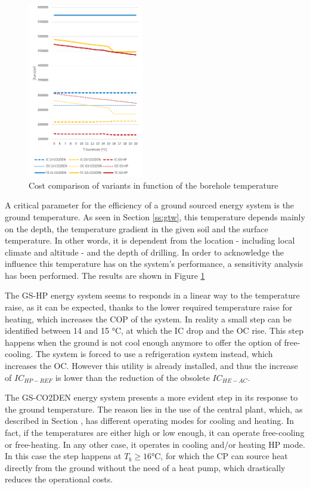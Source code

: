 \documentclass{article}
\begin{document}
\begin{figure} 
	\vspace{-20pt}
	\centering
	\includegraphics[width=0.45\textwidth]{V_SA_Tg.png}
	\caption{Cost comparison of variants in function of the borehole temperature}
	\label{fig:V_SA_Tg}
	\vspace{-10pt}
\end{figure}

A critical parameter for the efficiency of a ground sourced energy system is the ground temperature. As seen in Section \ref{ss:gtw}, this temperature depends mainly on the depth, the temperature gradient in the given soil and the surface temperature. In other words, it is dependent from the location - including local climate and altitude - and the depth of drilling. In order to acknowledge the influence this temperature has on the system's performance, a sensitivity analysis has been performed. The results are shown in Figure \ref{fig:V_SA_Tg}

The GS-HP energy system seems to responds in a linear way to the temperature raise, as it can be expected, thanks to the lower required temperature raise for heating, which increases the COP of the system. In reality a small step can be identified between 14 and 15 \si{\celsius}, at which the IC drop and the OC rise. This step happens when the ground is not cool enough anymore to offer the option of free-cooling. The system is forced to use a refrigeration system instead, which increases the OC. However this utility is already installed, and thus the increase of $IC_{HP-REF}$ is lower than the reduction of the obsolete $IC_{HE-AC}$.

The GS-CO2DEN energy system presents a more evident step in its response to the ground temperature. The reason lies in the use of the central plant, which, as described in Section , has different operating modes for cooling and heating. In fact, if the temperatures are either high or low enough, it can operate free-cooling or free-heating. In any other case, it operates in cooling and/or heating HP mode. In this case the step happens at $T_{b} \geq 16 \si{\celsius}$, for which the CP can source heat directly from the ground without the need of a heat pump, which drastically reduces the operational costs.
\end{document}

